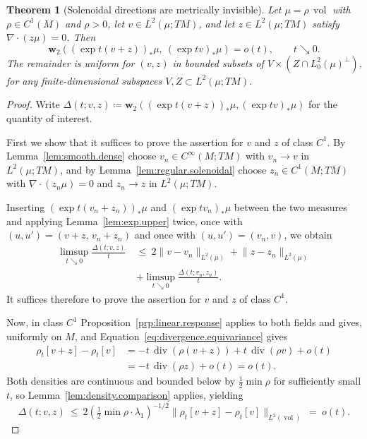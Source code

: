 \documentclass[11pt,reqno]{amsart}
\theoremstyle{plain}
\newtheorem{thm}{Theorem}[section]
\theoremstyle{definition}
\newcommand{\dw}{\mathbf{w}_2}
\DeclareMathOperator{\vol}{vol}
\DeclareMathOperator{\Div}{div}
\begin{document}
\begin{thm}[Solenoidal directions are metrically invisible]
\label{thm:solenoidal}
    Let \( \mu=\rho\,\vol \) with \( \rho\in C^1(M) \) and \( \rho>0 \), let \( v \in L^2(\mu;TM) \), and let \( z\in L^2(\mu;TM) \) satisfy \( \nabla\!\cdot(z\mu)=0 \).
    Then
    \[
        \dw\left((\exp t(v+z))_\ast\mu,\ (\exp tv)_\ast\mu\right)=o(t),\qquad t\searrow0 .
    \]
    The remainder is uniform for \( (v,z) \) in bounded subsets of \( V\times(Z\cap L^2_0(\mu)^\perp) \), for any finite-dimensional subspaces \( V,Z\subset L^2(\mu;TM) \).
\end{thm}

\begin{proof}
    Write \( \Delta(t;v,z)\coloneqq\dw\left((\exp t(v+z))_\ast\mu,(\exp tv)_\ast\mu\right) \) for the quantity of interest.

    First we show that it suffices to prove the assertion for \( v \) and \( z \) of class \( C^1 \).
    By Lemma~\ref{lem:smooth.dense} choose \( v_n\in C^\infty(M;TM) \) with \( v_n\to v \) in \( L^2(\mu;TM) \), and by Lemma~\ref{lem:regular.solenoidal} choose \( z_n\in C^1(M;TM) \) with \( \nabla\!\cdot(z_n\mu)=0 \) and \( z_n\to z \) in \( L^2(\mu;TM) \).

    Inserting \( (\exp t(v_n+z_n))_\ast\mu \) and \( (\exp tv_n)_\ast\mu \) between the two measures and applying Lemma~\ref{lem:exp.upper} twice, once with \( (u,u')=(v+z,\,v_n+z_n) \) and once with \( (u,u')=(v_n,v) \), we obtain
    \[
    \begin{split}
        \limsup_{t\searrow0}\frac{\Delta(t;v,z)}{t}\ &\le\ 2\lVert v-v_n\rVert_{L^2(\mu)}+\lVert z-z_n\rVert_{L^2(\mu)} \\
                                                     &+\limsup_{t\searrow0}\frac{\Delta(t;v_n,z_n)}{t}.
    \end{split}
    \]
    It suffices therefore to prove the assertion for \( v \) and \( z \) of class \( C^1 \).

    Now, in class \(C^1\) Proposition~\ref{prp:linear.response} applies to both fields and gives, uniformly on \( M \), and Equation~\eqref{eq:divergence.equivariance} gives
    \[
    \begin{split}
        \rho_t[v+z]-\rho_t[v]&=-t\,\Div\left(\rho(v+z)\right)+t\,\Div(\rho v)+o(t) \\ 
                             &=-t\,\Div(\rho z)+o(t)=o(t).
    \end{split}
    \]
    Both densities are continuous and bounded below by \( \tfrac12\min\rho \) for sufficiently small \( t \), so Lemma~\ref{lem:density.comparison} applies, yielding
    \begin{equation}\label{eq:estimate.remainder}
        \Delta(t;v,z)\ \le\ 2\left(\tfrac12\min\rho\cdot\lambda_1\right)^{-1/2}\big\lVert\rho_t[v+z]-\rho_t[v]\big\rVert_{L^2(\vol)}\ =\ o(t) .
    \end{equation}


\end{proof}
\end{document}
